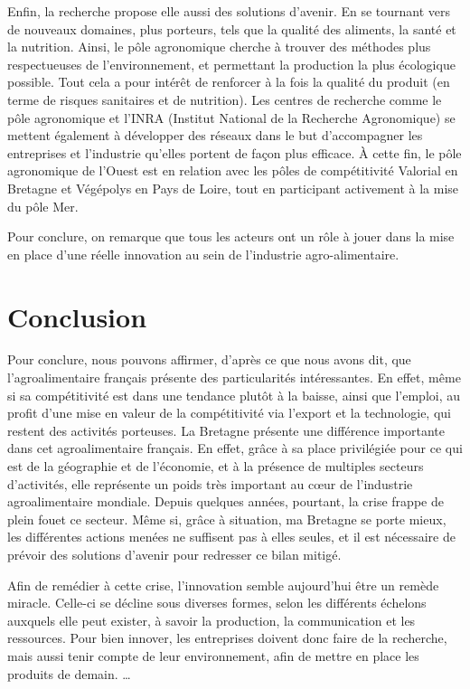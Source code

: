 \documentclass[a4paper,12pt]{report}
\begin{document}
			Enfin, la recherche propose elle aussi des solutions d’avenir. En se tournant vers de nouveaux domaines, plus porteurs, tels que la qualité des aliments, la santé et la nutrition. Ainsi, le pôle agronomique cherche à trouver des méthodes plus respectueuses de l’environnement, et permettant la production la plus écologique possible\cite{PoleAgroOuest}. Tout cela a pour intérêt de renforcer à la fois la qualité du produit (en terme de risques sanitaires et de nutrition). Les centres de recherche comme le pôle agronomique et l’INRA (Institut National de la Recherche Agronomique) se mettent également à développer des réseaux dans le but d’accompagner les entreprises et l’industrie qu’elles portent de façon plus efficace. À cette fin, le pôle agronomique de l’Ouest est en relation avec les pôles de compétitivité Valorial en Bretagne et Végépolys en Pays de Loire, tout en participant activement à la mise du pôle Mer\cite{PoleAgroOuest}. 

  			 Pour conclure, on remarque que tous les acteurs ont un rôle à jouer dans la mise en place d’une réelle innovation au sein de l’industrie agro-alimentaire.

\chapter*{Conclusion}
	Pour conclure, nous pouvons affirmer, d’après ce que nous avons dit, que l’agroalimentaire français présente des particularités intéressantes. En effet, même si sa compétitivité est dans une tendance plutôt à la baisse, ainsi que l’emploi, au profit d’une mise en valeur de la compétitivité via l’export et la technologie, qui restent des activités porteuses. La Bretagne présente une différence importante dans cet agroalimentaire français. En effet, grâce à sa place privilégiée pour ce qui est de la géographie et de l’économie, et à la présence de multiples secteurs d’activités, elle représente un poids très important au cœur de l’industrie agroalimentaire mondiale. Depuis quelques années, pourtant, la crise frappe de plein fouet ce secteur. Même si, grâce à situation, ma Bretagne se porte mieux, les différentes actions menées ne suffisent pas à elles seules, et il est nécessaire de prévoir des solutions d’avenir pour redresser ce bilan mitigé.
  
    Afin de remédier à cette crise, l’innovation semble aujourd’hui être un remède miracle.  Celle-ci se décline sous diverses formes, selon les différents échelons auxquels elle peut exister, à savoir la production, la communication et les ressources. Pour bien innover, les entreprises doivent donc faire de la recherche, mais aussi tenir compte de leur environnement, afin de mettre en place les produits de demain. …	%
   
\end{document}
